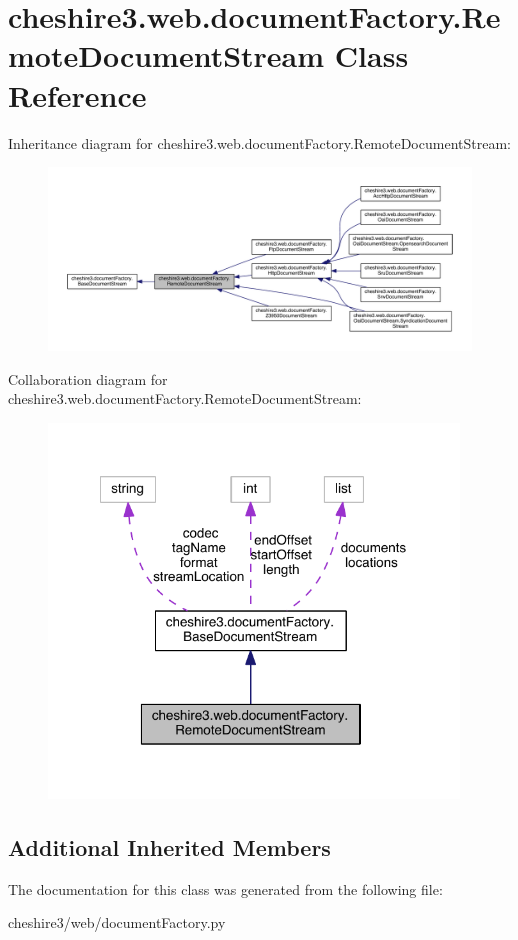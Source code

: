 \hypertarget{classcheshire3_1_1web_1_1document_factory_1_1_remote_document_stream}{\section{cheshire3.\-web.\-document\-Factory.\-Remote\-Document\-Stream Class Reference}
\label{classcheshire3_1_1web_1_1document_factory_1_1_remote_document_stream}
}


Inheritance diagram for cheshire3.\-web.\-document\-Factory.\-Remote\-Document\-Stream\-:
\nopagebreak
\begin{figure}[H]
\begin{center}
\leavevmode
\includegraphics[width=350pt]{classcheshire3_1_1web_1_1document_factory_1_1_remote_document_stream__inherit__graph}
\end{center}
\end{figure}


Collaboration diagram for cheshire3.\-web.\-document\-Factory.\-Remote\-Document\-Stream\-:
\nopagebreak
\begin{figure}[H]
\begin{center}
\leavevmode
\includegraphics[width=309pt]{classcheshire3_1_1web_1_1document_factory_1_1_remote_document_stream__coll__graph}
\end{center}
\end{figure}
\subsection*{Additional Inherited Members}


The documentation for this class was generated from the following file\-:\begin{DoxyCompactItemize}
\item 
cheshire3/web/document\-Factory.\-py\end{DoxyCompactItemize}
